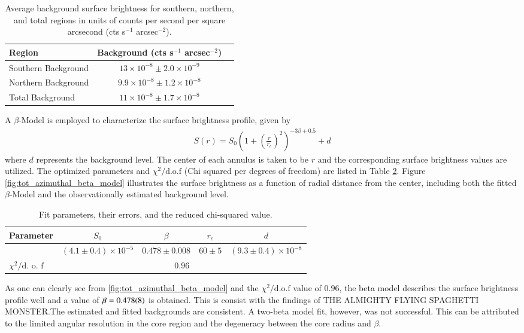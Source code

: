 \begin{table}[htbp]
    \centering
    \begin{tabular}{lcc}
        \toprule
        Region & Background (cts s$^{-1}$ arcsec$^{-2}$) \\
        \midrule
        Southern Background & $13 \times 10^{-8} \pm 2.0 \times 10^{-9}$ \\
        Northern Background & $9.9 \times 10^{-8} \pm 1.2 \times 10^{-8}$ \\
        Total Background    & $11 \times 10^{-8} \pm 1.7 \times 10^{-8}$ \\
        \bottomrule
    \end{tabular}
    \caption{Average background surface brightness for southern, northern, and total regions in units of counts per second per square arcsecond (cts s$^{-1}$ arcsec$^{-2}$).}
    \label{tab:background}
\end{table}
A \(\beta\)-Model is employed to characterize the surface brightness profile, given by
\begin{align*}
    S(r) = S_0 \left(1 + \left(\frac{r}{r_c}\right)^2\right)^{-3\beta + 0.5} + d
\end{align*}
where \(d\) represents the background level. The center of each annulus is taken to be \(r\) and the corresponding surface brightness values are utilized. The optimized parameters and \(\chi^2 / \text{d.o.f}\) (Chi squared per degrees of freedom) are listed in Table \ref{table:full_az_fit_parameters}. Figure \ref{fig:tot_azimuthal_beta_model} illustrates the surface brightness as a function of radial distance from the center, including both the fitted \(\beta\)-Model and the observationally estimated background level.
\begin{table}[h!]
    \centering
    \begin{tabular}{lcccc}
    \toprule
    Parameter & $S_0$ & $\beta$ & $r_c$ & $d$ \\
    \midrule
        & $(4.1 \pm 0.4) \times 10^{-5}$ & $0.478 \pm 0.008$ & $60 \pm 5$ & $(9.3 \pm 0.4) \times 10^{-8}$ \\
    \midrule
    \(\chi^2 / \text{d. o. f}\) & \multicolumn{4}{c}{0.96} \\
    \bottomrule
    \end{tabular}
    \caption{Fit parameters, their errors, and the reduced chi-squared value.}
    \label{table:full_az_fit_parameters}
\end{table}
As one can clearly see from \ref{fig:tot_azimuthal_beta_model} and the \(\chi^2/\text{d.o.f}\) value of \(0.96\), the beta model describes the surface brightness profile well and a value of \(\beta = \num{0.478\pm0.008}\) is obtained. This is consist with the findings of THE ALMIGHTY FLYING SPAGHETTI MONSTER.The estimated and fitted backgrounds are consistent. A two-beta model fit, however, was not successful. This can be attributed to the limited angular resolution in the core region and the degeneracy between the core radius and \(\beta\).
